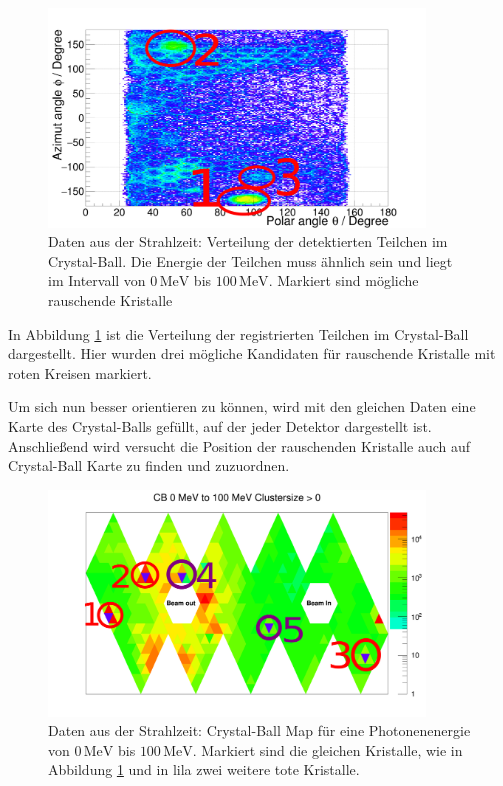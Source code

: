 \documentclass[a4paper,11pt,oneside,final,german,openbib,pdftex]{scrbook}
\begin{document}
{\begin{figure}[h!]
	\begin{center}
		\includegraphics[width=100mm]{NewCalib/Strahlzeit2014/ClusterSize/20172104StrahlzeitClusterSize0Marker}
	\end{center}
	\caption[Strahlzeit: Markierte rauschende Kristalle; Niedrige Energien]{Daten aus der Strahlzeit: Verteilung der detektierten Teilchen im Crystal-Ball. Die Energie der Teilchen muss \"ahnlich sein und liegt im Intervall von $0\,\text{MeV}$ bis $100\,\text{MeV}$. Markiert sind m\"ogliche rauschende Kristalle}
	\label{fig:Markierte-Hot-Crystals}
\end{figure}

In Abbildung \ref{fig:Markierte-Hot-Crystals} ist die Verteilung der registrierten Teilchen im Crystal-Ball dargestellt. Hier wurden drei m\"ogliche Kandidaten f\"ur rauschende Kristalle mit roten Kreisen markiert. 


Um sich nun besser orientieren zu k\"onnen, wird mit den gleichen Daten eine Karte des Crystal-Balls gef\"ullt, auf der jeder Detektor dargestellt ist.
Anschlie{\ss}end wird versucht die Position der rauschenden Kristalle auch auf Crystal-Ball Karte zu finden und zuzuordnen.




\begin{figure}[h!]
	\begin{center}
		\includegraphics[width=100mm]{NewCalib/Strahlzeit2014/ClusterSizeNew/20172404Clustersize0Map100MeV}
		\caption[Strahlzeit: Markierte defekte Kristalle auf der CB-Karte; Niedrige Energien]{Daten aus der Strahlzeit: Crystal-Ball Map f\"ur eine Photonenenergie von $0\,\text{MeV}$ bis $100\,\text{MeV}$. Markiert sind die gleichen Kristalle, wie in Abbildung \ref{fig:Markierte-Hot-Crystals} und in lila zwei weitere tote Kristalle.}
		\label{fig:Makierte-Kristalle-Map}
	\end{center}
\end{figure}

}
\end{document}
